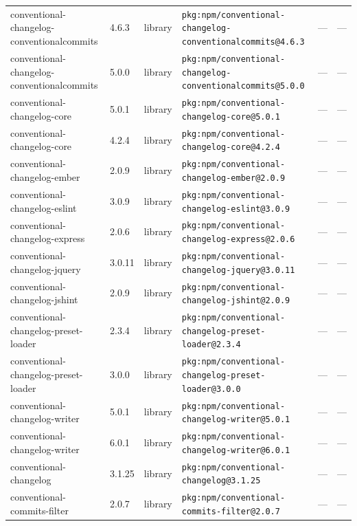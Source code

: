 \documentclass[11pt,a4paper]{article}
\begin{document}
\begin{longtable}{|p{4cm}|p{2cm}|p{1.6cm}|p{5cm}|p{1.5cm}|p{3.5cm}|}
\raggedright conventional-changelog-conventionalcommits & 4.6.3 & library & \small\texttt{pkg:npm/conventional-changelog-conventionalcommits@4.6.3} & — & \small — \\
\raggedright conventional-changelog-conventionalcommits & 5.0.0 & library & \small\texttt{pkg:npm/conventional-changelog-conventionalcommits@5.0.0} & — & \small — \\
\raggedright conventional-changelog-core & 5.0.1 & library & \small\texttt{pkg:npm/conventional-changelog-core@5.0.1} & — & \small — \\
\raggedright conventional-changelog-core & 4.2.4 & library & \small\texttt{pkg:npm/conventional-changelog-core@4.2.4} & — & \small — \\
\raggedright conventional-changelog-ember & 2.0.9 & library & \small\texttt{pkg:npm/conventional-changelog-ember@2.0.9} & — & \small — \\
\raggedright conventional-changelog-eslint & 3.0.9 & library & \small\texttt{pkg:npm/conventional-changelog-eslint@3.0.9} & — & \small — \\
\raggedright conventional-changelog-express & 2.0.6 & library & \small\texttt{pkg:npm/conventional-changelog-express@2.0.6} & — & \small — \\
\raggedright conventional-changelog-jquery & 3.0.11 & library & \small\texttt{pkg:npm/conventional-changelog-jquery@3.0.11} & — & \small — \\
\raggedright conventional-changelog-jshint & 2.0.9 & library & \small\texttt{pkg:npm/conventional-changelog-jshint@2.0.9} & — & \small — \\
\raggedright conventional-changelog-preset-loader & 2.3.4 & library & \small\texttt{pkg:npm/conventional-changelog-preset-loader@2.3.4} & — & \small — \\
\raggedright conventional-changelog-preset-loader & 3.0.0 & library & \small\texttt{pkg:npm/conventional-changelog-preset-loader@3.0.0} & — & \small — \\
\raggedright conventional-changelog-writer & 5.0.1 & library & \small\texttt{pkg:npm/conventional-changelog-writer@5.0.1} & — & \small — \\
\raggedright conventional-changelog-writer & 6.0.1 & library & \small\texttt{pkg:npm/conventional-changelog-writer@6.0.1} & — & \small — \\
\raggedright conventional-changelog & 3.1.25 & library & \small\texttt{pkg:npm/conventional-changelog@3.1.25} & — & \small — \\
\raggedright conventional-commits-filter & 2.0.7 & library & \small\texttt{pkg:npm/conventional-commits-filter@2.0.7} & — & \small — \\

\end{longtable}
\end{document}
